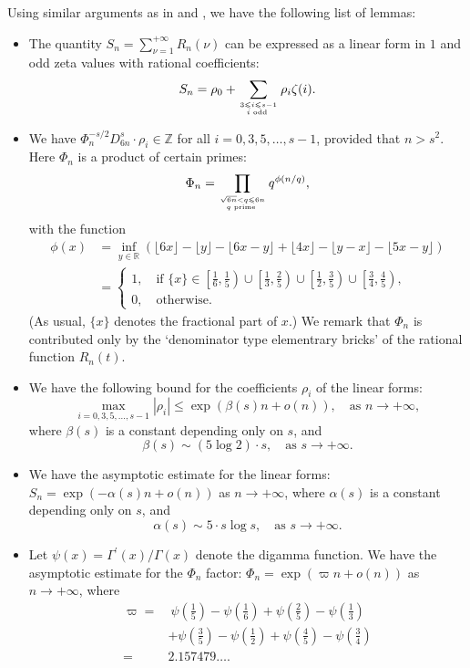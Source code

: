 \documentclass[12pt]{article}
\numberwithin{equation}{section}
\begin{document}
Using similar arguments as in \cite{BR2001} and \cite{Zud2004}, we have the following list of lemmas:
\begin{itemize}
	\item The quantity $S_n = \sum_{\nu=1}^{+\infty} R_n(\nu)$ can be expressed as a linear form in $1$ and odd zeta values with rational coefficients:
	\[ S_n = \rho_0 + \sum_{3 \leqslant i \leqslant s-1 \atop i \text{~odd~}} \rho_i \zeta(i).  \]
	
	\item We have $\Phi_n^{-s/2}D_{6n}^s \cdot \rho_i \in \mathbb{Z}$ for all $i=0,3,5,\ldots,s-1$, provided that $n>s^2$. Here $\Phi_n$ is a product of certain primes: 
	\[  \Phi_n =  \prod_{\sqrt{6n} < q \leqslant 6n \atop q \text{~prime~}} q^{\phi(n/q)}, \]
	with the function
	\begin{align*}
	 \phi(x) &= \inf_{y \in \mathbb{R}} \left(  \lfloor6x\rfloor - \lfloor y \rfloor - \lfloor 6x - y \rfloor + \lfloor4x\rfloor - \lfloor y- x \rfloor - \lfloor 5x - y \rfloor \right) \\
	 &= \begin{cases}
	 	1, \quad\text{if~} \{x\} \in \left[\frac{1}{6},\frac{1}{5}\right) \cup \left[\frac{1}{3},\frac{2}{5}\right) \cup \left[\frac{1}{2},\frac{3}{5}\right) \cup \left[\frac{3}{4},\frac{4}{5}\right), \\
	 	0, \quad\text{otherwise.} 
	 \end{cases}
	 \end{align*}
 (As usual, $\{x\}$ denotes the fractional part of $x$.) We remark that $\Phi_n$ is contributed only by the `denominator type elementrary bricks' of the rational function $R_n(t)$.
	
	\item We have the following bound for the coefficients $\rho_i$ of the linear forms: 
	\[\max_{i=0,3,5,\ldots,s-1} |\rho_i| \leqslant \exp\left( \beta(s)n + o(n) \right), \quad \text{as~} n \to +\infty, \]
	where $\beta(s)$ is a constant depending only on $s$, and
	\[ \beta(s) \sim (5\log 2) \cdot s,  \quad\text{as~} s \to +\infty. \] 
	
	\item We have the asymptotic estimate for the linear forms:
	$S_n = \exp\left( -\alpha(s) n + o(n)  \right)$ as $n \to +\infty$, where $\alpha(s)$ is a constant depending only on $s$, and 
	\[ \alpha(s) \sim 5 \cdot s\log s, \quad \text{as~} s \to +\infty.  \]
	
	\item Let $\psi(x) = \Gamma^{\prime}(x)/\Gamma(x)$ denote the digamma function. We have the asymptotic estimate for the $\Phi_n$ factor:
	$\Phi_n = \exp\left( \varpi n + o(n) \right)$ as $n \to +\infty$, where 
	\begin{align*}
		 \varpi =&~ \psi\left(\frac{1}{5}\right) - \psi\left(\frac{1}{6}\right) + \psi\left(\frac{2}{5}\right) - \psi\left(\frac{1}{3}\right) \\
		 &+ \psi\left(\frac{3}{5}\right) - \psi\left(\frac{1}{2}\right) + \psi\left(\frac{4}{5}\right) - \psi\left(\frac{3}{4}\right) \\
		   =& 2.157479\ldots.
	\end{align*}
\end{itemize}
\end{document}
